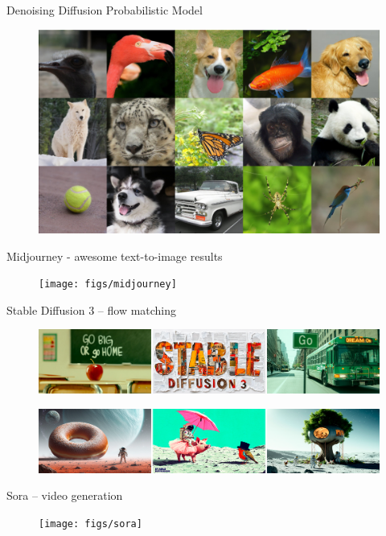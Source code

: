 \begin{frame}{Denoising Diffusion Probabilistic Model}
	\begin{figure}
		\includegraphics[width=\linewidth]{figs/diffusion_models}
	\end{figure}
\end{frame}
\begin{frame}{Midjourney - awesome text-to-image results}
	\begin{figure}
		\texttt{[image: figs/midjourney]}
	\end{figure}
\end{frame}
\begin{frame}{Stable Diffusion 3 -- flow matching}
		\begin{figure}
			\includegraphics[width=\linewidth]{figs/sd3_1}
		\end{figure}
		\begin{figure}
			\includegraphics[width=\linewidth]{figs/sd3_2}
		\end{figure}
\end{frame}
\begin{frame}{Sora -- video generation}
		\begin{figure}
			\texttt{[image: figs/sora]}
		\end{figure}
\end{frame}
